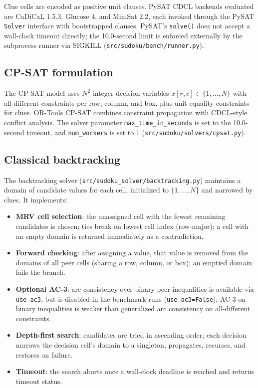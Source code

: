 \documentclass[a4paper,fleqn]{cas-sc}
\newcommand{\code}[1]{\texttt{\nolinkurl{#1}}}
\begin{document}
Clue cells are encoded as positive unit clauses. PySAT CDCL backends evaluated are CaDiCaL 1.5.3, Glucose 4, and MiniSat 2.2, each invoked through the PySAT \texttt{Solver} interface with bootstrapped clauses. PySAT's \texttt{solve()} does not accept a wall-clock timeout directly; the 10.0-second limit is enforced externally by the subprocess runner via SIGKILL (\code{src/sudoku/bench/runner.py}).

\subsection{CP-SAT formulation}

The CP-SAT model uses \(N^2\) integer decision variables \(x[r,c] \in \{1,\dots,N\}\) with all-different constraints per row, column, and box, plus unit equality constraints for clues. OR-Tools CP-SAT combines constraint propagation with CDCL-style conflict analysis. The solver parameter \code{max_time_in_seconds} is set to the 10.0-second timeout, and \code{num_workers} is set to 1 (\code{src/sudoku/solvers/cpsat.py}).

\subsection{Classical backtracking}\label{sec:backtracking}

The backtracking solver (\code{src/sudoku_solver/backtracking.py}) maintains a domain of candidate values for each cell, initialized to \(\{1,\dots,N\}\) and narrowed by clues. It implements:
\begin{itemize}
    \item \textbf{MRV cell selection}: the unassigned cell with the fewest remaining candidates is chosen; ties break on lowest cell index (row-major); a cell with an empty domain is returned immediately as a contradiction.
    \item \textbf{Forward checking}: after assigning a value, that value is removed from the domains of all peer cells (sharing a row, column, or box); an emptied domain fails the branch.
    \item \textbf{Optional AC-3}: arc consistency over binary peer inequalities is available via \texttt{use\_ac3}, but is disabled in the benchmark runs (\texttt{use\_ac3=False}); AC-3 on binary inequalities is weaker than generalized arc consistency on all-different constraints.
    \item \textbf{Depth-first search}: candidates are tried in ascending order; each decision narrows the decision cell's domain to a singleton, propagates, recurses, and restores on failure.
    \item \textbf{Timeout}: the search aborts once a wall-clock deadline is reached and returns timeout status.
\end{itemize}
\end{document}
